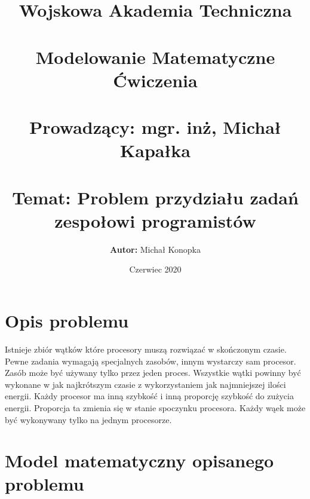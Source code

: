 \documentclass[a4paper,12pt]{extarticle}
\title{%
  Wojskowa Akademia Techniczna \\~\\
  \large Modelowanie Matematyczne Ćwiczenia \\~\\
    \textbf{Prowadzący:} mgr. inż, Michał Kapałka \\~\\
    \textbf{Temat:} Problem przydziału zadań zespołowi programistów}
\author{\textbf{Autor:} Michał Konopka}
\date{Czerwiec 2020}
\begin{document}
\maketitle
\newpage

\section{Opis problemu}
Istnieje zbiór wątków które procesory muszą rozwiązać w skończonym czasie. Pewne zadania wymagają specjalnych zasobów, innym wystarczy sam procesor. Zasób może być używany tylko przez jeden proces. Wszystkie wątki powinny być wykonane w jak najkrótszym czasie z wykorzystaniem jak najmniejszej ilości energii. Każdy procesor ma inną szybkość i inną proporcję szybkość do zużycia energii. Proporcja ta zmienia się w stanie spoczynku procesora. Każdy wąek może być wykonywany tylko na jednym procesorze.
\section{Model matematyczny opisanego problemu}
\end{document}
